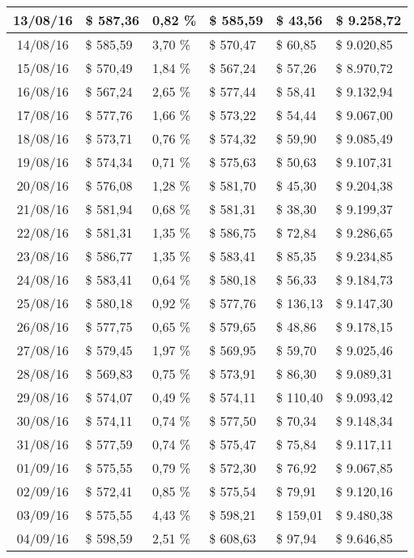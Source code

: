 \begin{small}
\begin{longtable}{|c|l|l|l|l|l|}
13/08/16 & \$ 587,36 & 0,82 \% & \$ 585,59 & \$ 43,56 & \$ 9.258,72 \\ \hline
14/08/16 & \$ 585,59 & 3,70 \% & \$ 570,47 & \$ 60,85 & \$ 9.020,85 \\ \hline
15/08/16 & \$ 570,49 & 1,84 \% & \$ 567,24 & \$ 57,26 & \$ 8.970,72 \\ \hline
16/08/16 & \$ 567,24 & 2,65 \% & \$ 577,44 & \$ 58,41 & \$ 9.132,94 \\ \hline
17/08/16 & \$ 577,76 & 1,66 \% & \$ 573,22 & \$ 54,44 & \$ 9.067,00 \\ \hline
18/08/16 & \$ 573,71 & 0,76 \% & \$ 574,32 & \$ 59,90 & \$ 9.085,49 \\ \hline
19/08/16 & \$ 574,34 & 0,71 \% & \$ 575,63 & \$ 50,63 & \$ 9.107,31 \\ \hline
20/08/16 & \$ 576,08 & 1,28 \% & \$ 581,70 & \$ 45,30 & \$ 9.204,38 \\ \hline
21/08/16 & \$ 581,94 & 0,68 \% & \$ 581,31 & \$ 38,30 & \$ 9.199,37 \\ \hline
22/08/16 & \$ 581,31 & 1,35 \% & \$ 586,75 & \$ 72,84 & \$ 9.286,65 \\ \hline
23/08/16 & \$ 586,77 & 1,35 \% & \$ 583,41 & \$ 85,35 & \$ 9.234,85 \\ \hline
24/08/16 & \$ 583,41 & 0,64 \% & \$ 580,18 & \$ 56,33 & \$ 9.184,73 \\ \hline
25/08/16 & \$ 580,18 & 0,92 \% & \$ 577,76 & \$ 136,13 & \$ 9.147,30 \\ \hline
26/08/16 & \$ 577,75 & 0,65 \% & \$ 579,65 & \$ 48,86 & \$ 9.178,15 \\ \hline
27/08/16 & \$ 579,45 & 1,97 \% & \$ 569,95 & \$ 59,70 & \$ 9.025,46 \\ \hline
28/08/16 & \$ 569,83 & 0,75 \% & \$ 573,91 & \$ 86,30 & \$ 9.089,31 \\ \hline
29/08/16 & \$ 574,07 & 0,49 \% & \$ 574,11 & \$ 110,40 & \$ 9.093,42 \\ \hline
30/08/16 & \$ 574,11 & 0,74 \% & \$ 577,50 & \$ 70,34 & \$ 9.148,34 \\ \hline
31/08/16 & \$ 577,59 & 0,74 \% & \$ 575,47 & \$ 75,84 & \$ 9.117,11 \\ \hline
01/09/16 & \$ 575,55 & 0,79 \% & \$ 572,30 & \$ 76,92 & \$ 9.067,85 \\ \hline
02/09/16 & \$ 572,41 & 0,85 \% & \$ 575,54 & \$ 79,91 & \$ 9.120,16 \\ \hline
03/09/16 & \$ 575,55 & 4,43 \% & \$ 598,21 & \$ 159,01 & \$ 9.480,38 \\ \hline
04/09/16 & \$ 598,59 & 2,51 \% & \$ 608,63 & \$ 97,94 & \$ 9.646,85 \\ \hline

\end{longtable}
\end{small}
